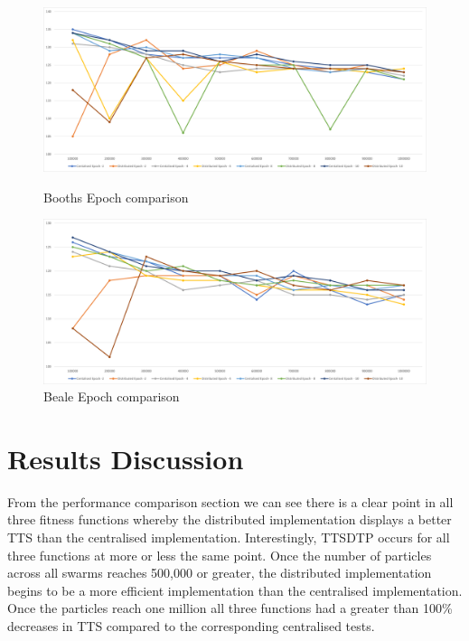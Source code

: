 \documentclass[oneside,12pt]{book}
\begin{document}
\begin{figure}[H]
  \centering
  \begin{minipage}[b]{0.48\textwidth}
    \includegraphics[width=\textwidth]{Images/Graphs/PerformanceComparisonBoothsEpoch.png}
    \caption{Booths Epoch comparison}
    \label{fig:PerformanceComparisonBoothsEpoch}
  \end{minipage}
  \hfill
  \begin{minipage}[b]{0.48\textwidth}
    \includegraphics[width=\textwidth]{Images/Graphs/PerformanceComparisonBealeEpoch.png}
    \caption{Beale Epoch comparison}
    \label{fig:PerformanceComparisonBealeEpoch}
  \end{minipage}
\end{figure}

\section{Results Discussion}
From the performance comparison section we can see there is a clear point in all three fitness functions whereby the distributed implementation displays a better TTS than the centralised implementation. Interestingly, TTSDTP occurs for all three functions at more or less the same point. Once the number of particles across all swarms reaches 500,000 or greater, the distributed implementation begins to be a more efficient implementation than the centralised implementation. Once the particles reach one million all three functions had a greater than 100\% decreases in TTS compared to the corresponding centralised tests.
\end{document}
